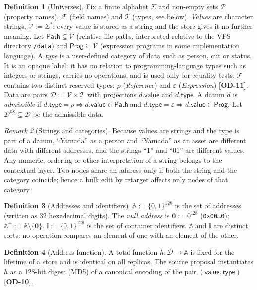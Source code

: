 \documentclass[11pt,a4paper]{article}
\theoremstyle{definition}
\newtheorem{definition}{Definition}[section]
\theoremstyle{plain}
\theoremstyle{remark}
\newtheorem{remark}[definition]{Remark}
\newcommand{\od}[1]{\textsf{\textbf{\textcolor{BrickRed}{[OD-#1]}}}}
\newcommand{\Val}{\mathcal{V}}
\newcommand{\Typ}{\mathcal{T}}
\newcommand{\Dat}{\mathcal{D}}
\newcommand{\Adr}{\mathbb{A}}
\newcommand{\Idn}{\mathbb{I}}
\newcommand{\Prp}{\mathcal{P}}
\newcommand{\Fld}{\mathcal{F}}
\newcommand{\Pth}{\mathsf{Path}}
\newcommand{\Prog}{\mathsf{Prog}}
\newcommand{\nul}{\mathbf{0}}
\newcommand{\tRef}{\rho}
\newcommand{\tExp}{\varepsilon}
\begin{document}
\begin{definition}[Universes]\label{def:universes}
Fix a finite alphabet $\Sigma$ and non-empty sets $\Prp$ (property names), $\Fld$ (field names) and $\Typ$ (types, see below).
\emph{Values} are character strings, $\Val:=\Sigma^{*}$: every value is stored as a string and the store gives it no further meaning. Let
$\Pth\subseteq\Val$ (relative file paths, interpreted relative to the VFS directory \texttt{/data}) and
$\Prog\subseteq\Val$ (expression programs in some implementation language).
A \emph{type} is a user-defined category of data such as \textsf{person}, \textsf{cut} or \textsf{status}.
It is an opaque label: it has no relation to programming-language types such as integers or strings, carries no operations, and is used only for equality tests.
$\Typ$ contains two distinct reserved types: $\tRef$ (\emph{Reference}) and $\tExp$ (\emph{Expression}) \od{11}.
Data are pairs $\Dat:=\Val\times\Typ$ with projections $d.\mathsf{value}$ and $d.\mathsf{type}$.
A datum $d$ is \emph{admissible} if $d.\mathsf{type}=\tRef\Rightarrow d.\mathsf{value}\in\Pth$ and
$d.\mathsf{type}=\tExp\Rightarrow d.\mathsf{value}\in\Prog$. Let $\Dat^{\mathrm{ok}}\subseteq\Dat$ be the admissible data.
\end{definition}

\begin{remark}[Strings and categories]\label{rem:strings}
Because values are strings and the type is part of a datum, ``Yamada'' as a \textsf{person} and ``Yamada'' as an \textsf{asset} are different data with different addresses,
and the strings ``1'' and ``01'' are different values.
Any numeric, ordering or other interpretation of a string belongs to the contextual layer.
Two nodes share an address only if both the string and the category coincide; hence a bulk edit by \textsf{retarget} affects only nodes of that category.
\end{remark}

\begin{definition}[Addresses and identifiers]\label{def:addr}
$\Adr:=\{0,1\}^{128}$ is the set of addresses (written as 32 hexadecimal digits).
The \emph{null address} is $\nul:=0^{128}$ (\texttt{0x00\dots0}); $\Adr^{+}:=\Adr\setminus\{\nul\}$.
$\Idn:=\{0,1\}^{128}$ is the set of container identifiers.
$\Adr$ and $\Idn$ are distinct sorts: no operation compares an element of one with an element of the other.
\end{definition}

\begin{definition}[Address function]\label{def:hash}
A total function $h:\Dat\to\Adr$ is fixed for the lifetime of a store and is identical on all replicas.
The source proposal instantiates $h$ as a 128-bit digest (MD5) of a canonical encoding of the pair $(\mathsf{value},\mathsf{type})$ \od{10}.
\end{definition}
\end{document}
